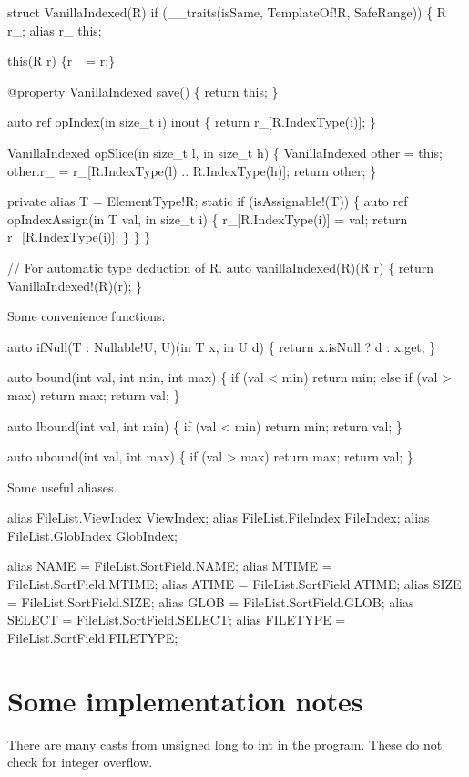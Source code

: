 struct VanillaIndexed(R)
  if (__traits(isSame, TemplateOf!R, SafeRange))
\{
  R r_;
  alias r_ this;

  this(R r) \{r_ = r;\}

  @property
  VanillaIndexed save() \{ return this; \}

  auto ref opIndex(in size_t i) inout \{
    return r_[R.IndexType(i)];
  \}

  VanillaIndexed opSlice(in size_t l, in size_t h)
  \{
    VanillaIndexed other = this;
    other.r_ = r_[R.IndexType(l) .. R.IndexType(h)];
    return other;
  \}

  private alias T = ElementType!R;
  static if (isAssignable!(T)) \{
    auto ref opIndexAssign(in T val, in size_t i) \{
      r_[R.IndexType(i)] = val;
      return r_[R.IndexType(i)];
    \}
  \}
\}

// For automatic type deduction of R.
auto vanillaIndexed(R)(R r)
\{
  return VanillaIndexed!(R)(r);
\}

\nwendcode{}Some convenience functions.

\nwenddocs{}\endmoddef\nwstartdeflinemarkup\nwenddeflinemarkup
auto ifNull(T : Nullable!U, U)(in T x, in U d)
\{
  return x.isNull ? d : x.get;
\}

auto bound(int val, int min, int max)
\{
  if (val < min) return min;
  else if (val > max) return max;
  return val;
\}

auto lbound(int val, int min)
\{
  if (val < min) return min;
  return val;
\}

auto ubound(int val, int max)
\{
  if (val > max) return max;
  return val;
\}


\nwendcode{}Some useful aliases.

\nwenddocs{}\endmoddef\nwstartdeflinemarkup\nwenddeflinemarkup
alias FileList.ViewIndex ViewIndex;
alias FileList.FileIndex FileIndex;
alias FileList.GlobIndex GlobIndex;

alias NAME     = FileList.SortField.NAME;
alias MTIME    = FileList.SortField.MTIME;
alias ATIME    = FileList.SortField.ATIME;
alias SIZE     = FileList.SortField.SIZE;
alias GLOB     = FileList.SortField.GLOB;
alias SELECT   = FileList.SortField.SELECT;
alias FILETYPE = FileList.SortField.FILETYPE;

\nwendcode{}\section{Some implementation notes} There are many casts from
unsigned long to int in the program. These do not check for integer
overflow.
\nwenddocs{}
